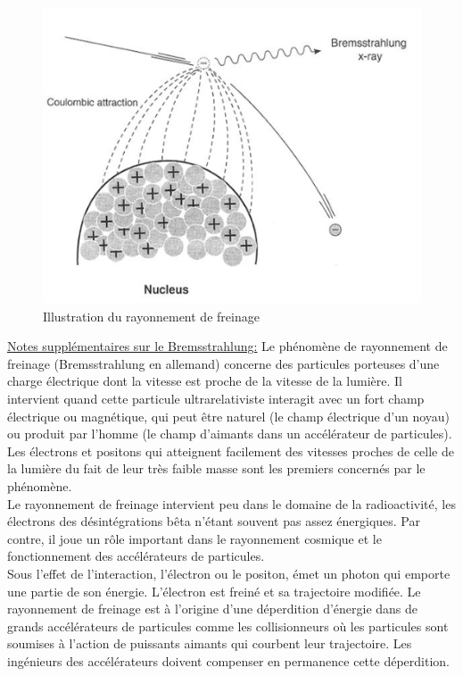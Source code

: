     \begin{figure}[ht]
        \centering
        \includegraphics[scale=0.50]{Images1/Bremsstrahlung2.PNG}
        \caption{Illustration du rayonnement de freinage}
    \end{figure}
    
    \underline{Notes supplémentaires sur le Bremsstrahlung:} Le phénomène de rayonnement de freinage (Bremsstrahlung en allemand) concerne des particules porteuses d’une charge électrique dont la vitesse est proche de la vitesse de la lumière. Il intervient quand cette particule ultrarelativiste interagit avec un fort champ électrique ou magnétique, qui peut être naturel (le champ électrique d’un noyau) ou produit par l’homme (le champ d’aimants dans un accélérateur de particules). Les électrons et positons qui atteignent facilement des vitesses proches de celle de la lumière du fait de leur très faible masse sont les premiers concernés par le phénomène. \\

    Le rayonnement de freinage intervient peu dans le domaine de la radioactivité, les électrons des désintégrations bêta n'étant souvent pas assez énergiques. Par contre, il joue un rôle important dans le rayonnement cosmique et le fonctionnement des accélérateurs de particules. \\

    Sous l’effet de l’interaction, l’électron ou le positon, émet un photon qui emporte une partie de son énergie. L’électron est freiné et sa trajectoire modifiée. Le rayonnement de freinage est à l’origine d’une déperdition d’énergie dans de grands accélérateurs de particules comme les collisionneurs où les particules sont soumises à l’action de puissants aimants qui courbent leur trajectoire. Les ingénieurs des accélérateurs doivent compenser en permanence cette déperdition.
    
